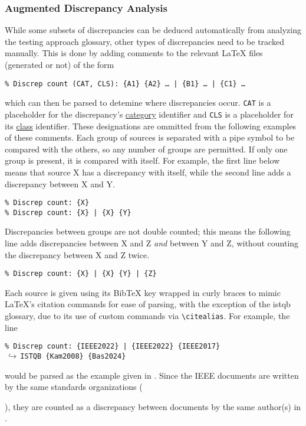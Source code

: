 \subsubsection{Augmented Discrepancy Analysis}
\label{aug-discrep-analysis}
While some subsets of discrepancies can be deduced automatically from analyzing
the testing approach glossary, other types of discrepancies need to be tracked
manually. This is done by adding
comments to the relevant \LaTeX{} files (generated or not) of the form
\begin{displayquote}
    \texttt{\% Discrep count (CAT, CLS): \{A1\} \{A2\} \dots{} | \{B1\}
        \dots{} | \{C1\} %
        \dots}
\end{displayquote}
which can then be parsed to detemine where discrepancies occur. \texttt{CAT} is
a placeholder for the discrepancy's \hyperref[discrepCategories]{category}
identifier and \texttt{CLS} is a placeholder for its
\hyperref[discrepClasses]{class} identifier. These designations are ommitted
from the following examples of these comments. Each group of
sources is separated with a pipe symbol to be compared with the others, so any
number of groups are permitted. If only one group is present, it is compared
with itself. For example, the first line below means that source X has a
discrepancy with itself, while the second line adds a discrepancy between X and Y.
\begin{displayquote}
    \texttt{\% Discrep count: \{X\}\\\% Discrep count: \{X\} | \{X\} \{Y\}}
\end{displayquote}
Discrepancies between groups are not double counted; this means the following
line adds discrepancies between X and Z \emph{and} between Y and Z, without
counting the discrepancy between X and Z twice.
\begin{displayquote}
    \texttt{\% Discrep count: \{X\} | \{X\} \{Y\} | \{Z\}}
\end{displayquote}
Each source is given using its BibTeX key wrapped in curly braces to mimic
\LaTeX{}'s citation commands for ease of parsing, with the exception of the
\acs{istqb} glossary, due to its use of custom commands via
\texttt{\textbackslash citealias}. For example, the line
\begin{displayquote}
    \texttt{\% Discrep count: \{IEEE2022\} | \{IEEE2022\} \{IEEE2017\}\\
        $\,\hookrightarrow\,$\quad ISTQB \{Kam2008\} \{Bas2024\}}
\end{displayquote}
would be parsed as the example given in . Since
the IEEE documents are written by the same standards organizations
(\begin{NoHyper}\citeauthor{IEEE2022}\end{NoHyper}), they are counted as a
discrepancy between documents by the same author(s) in .

